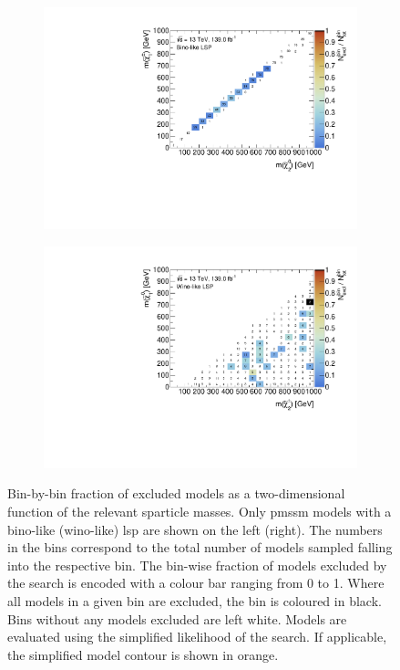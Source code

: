 \begin{figure}
	\begin{subfigure}[b]{0.5\linewidth}
		\centering\includegraphics[width=\textwidth]{cut_bino_LSP/mchi1p_mchi20_contour}
	\end{subfigure}\hfill
	\begin{subfigure}[b]{0.5\linewidth}
		\centering\includegraphics[width=\textwidth]{cut_wino_LSP/mchi10_mchi2p_contour}
	\end{subfigure}\hfill	
	
	\caption{Bin-by-bin fraction of excluded models as a two-dimensional function of the relevant sparticle masses. Only \gls{pmssm} models with a bino-like (wino-like) \gls{lsp} are shown on the left (right). The numbers in the bins correspond to the total number of models sampled falling into the respective bin. The bin-wise fraction of models excluded by the \onelepton search is encoded with a colour bar ranging from 0 to 1. Where all models in a given bin are excluded, the bin is coloured in black. Bins without any models excluded are left white. Models are evaluated using the simplified likelihood of the \onelepton search. If applicable, the simplified model contour is shown in orange.}
	\label{fig:impact_electroweakinos_2D_bino_lsp}
\end{figure}


